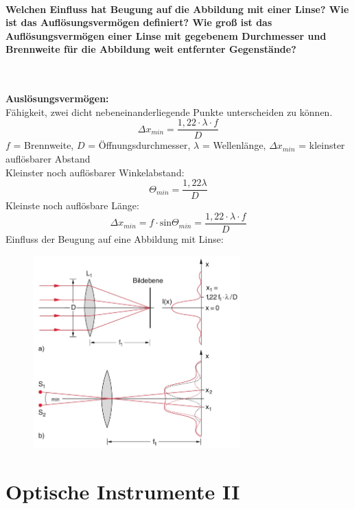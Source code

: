 \documentclass[a4paper, 11pt, ngerman, parskip=half-]{scrartcl}
\begin{document}
    \paragraph{Welchen Einfluss hat Beugung auf die Abbildung mit einer Linse? Wie ist das
        Auflösungsvermögen definiert? Wie groß ist das Auflösungsvermögen einer Linse mit gegebenem
        Durchmesser und Brennweite für die Abbildung weit entfernter Gegenstände?} ~

    \textbf{Auslösungsvermögen:}\\
    Fähigkeit, zwei dicht nebeneinanderliegende Punkte unterscheiden zu können.
    \begin{equation}
        \Delta x_{min} = \frac{1,22 \cdot \lambda \cdot f}{D}
    \end{equation}
$f$ = Brennweite, $D$ = Öffnungsdurchmesser, $\lambda$ = Wellenlänge, $\Delta x_{min}$ = kleinster auflösbarer Abstand\\
    Kleinster noch auflösbarer Winkelabstand:
    \begin{equation}
        \Theta_{min} = \frac{1,22 \lambda}{D}
    \end{equation}
    Kleinste noch auflösbare Länge:
    \begin{equation}
        \Delta x_{min} = f \cdot \text{sin} \Theta_{min} = \frac{1,22 \cdot \lambda \cdot f}{D}
    \end{equation}
    Einfluss der Beugung auf eine Abbildung mit Linse:
    \begin{figure}[H]
        \centering
        \includegraphics[width=8cm]{image/20/13.png}
    \end{figure}

    \newpage

    \section{Optische Instrumente II}
\end{document}
